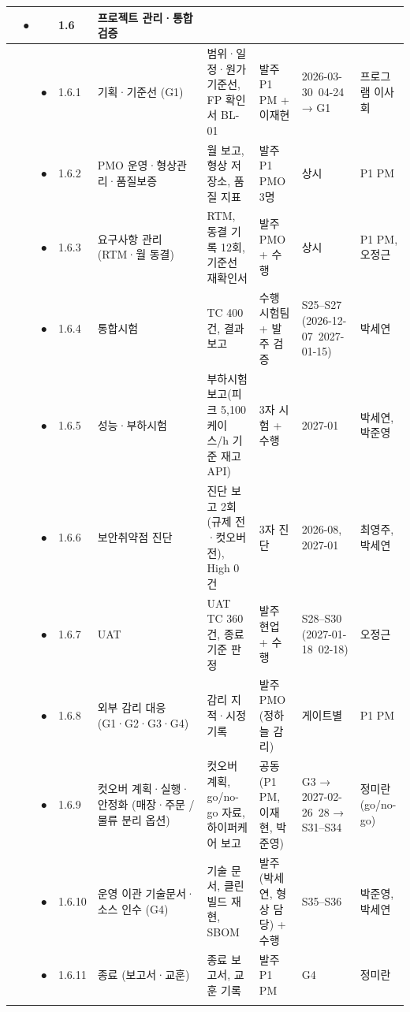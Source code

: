 \documentclass[10pt,a4paper]{article}
\begin{document}
{\begin{longtable}{|C{7mm}|C{7mm}|C{7mm}|L{12mm}|L{52mm}|L{52mm}|L{44mm}|L{30mm}|L{28mm}|}
& ● & & \textbf{1.6} & \textbf{프로젝트 관리·통합 검증} & & & & \\ \hline
& & ● & 1.6.1 & 기획·기준선 (G1) & 범위·일정·원가 기준선, FP 확인서 BL-01 & 발주 P1 PM + 이재현 & 2026-03-30~04-24 → G1 & 프로그램 이사회 \\ \hline
& & ● & 1.6.2 & PMO 운영·형상관리·품질보증 & 월 보고, 형상 저장소, 품질 지표 & 발주 P1 PMO 3명 & 상시 & P1 PM \\ \hline
& & ● & 1.6.3 & 요구사항 관리 (RTM·월 동결) & RTM, 동결 기록 12회, 기준선 재확인서 & 발주 PMO + 수행 & 상시 & P1 PM, 오정근 \\ \hline
& & ● & 1.6.4 & 통합시험 & TC 400건, 결과 보고 & 수행 시험팀 + 발주 검증 & S25–S27 (2026-12-07~2027-01-15) & 박세연 \\ \hline
& & ● & 1.6.5 & 성능·부하시험 & 부하시험 보고(피크 5,100 케이스/h 기준 재고 API) & 3자 시험 + 수행 & 2027-01 & 박세연, 박준영 \\ \hline
& & ● & 1.6.6 & 보안취약점 진단 & 진단 보고 2회(규제 전·컷오버 전), High 0건 & 3자 진단 & 2026-08, 2027-01 & 최영주, 박세연 \\ \hline
& & ● & 1.6.7 & UAT & UAT TC 360건, 종료 기준 판정 & 발주 현업 + 수행 & S28–S30 (2027-01-18~02-18) & 오정근 \\ \hline
& & ● & 1.6.8 & 외부 감리 대응 (G1·G2·G3·G4) & 감리 지적·시정 기록 & 발주 PMO (정하늘 감리) & 게이트별 & P1 PM \\ \hline
& & ● & 1.6.9 & 컷오버 계획·실행·안정화 (매장·주문 / 물류 분리 옵션) & 컷오버 계획, go/no-go 자료, 하이퍼케어 보고 & 공동 (P1 PM, 이재현, 박준영) & G3 → 2027-02-26~28 → S31–S34 & 정미란(go/no-go) \\ \hline
& & ● & 1.6.10 & 운영 이관 기술문서·소스 인수 (G4) & 기술 문서, 클린 빌드 재현, SBOM & 발주 (박세연, 형상 담당) + 수행 & S35–S36 & 박준영, 박세연 \\ \hline
& & ● & 1.6.11 & 종료 (보고서·교훈) & 종료 보고서, 교훈 기록 & 발주 P1 PM & G4 & 정미란 \\ \hline
\fi
\end{longtable}}
\end{document}
